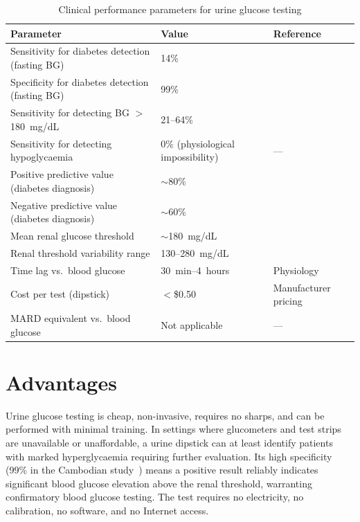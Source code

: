 \begin{table}[H]
\centering
\caption{Clinical performance parameters for urine glucose testing}
\label{tab:urine_stats}
\begin{tabular}{p{7.5cm}p{3.5cm}p{2.5cm}}
\toprule
\textbf{Parameter} & \textbf{Value} & \textbf{Reference} \\
\midrule
Sensitivity for diabetes detection (fasting BG) & 14\% & \cite{cambodia2018} \\
Specificity for diabetes detection (fasting BG) & 99\% & \cite{cambodia2018} \\
Sensitivity for detecting BG $>$180~mg/dL & 21--64\% & \cite{tfrenal} \\
Sensitivity for detecting hypoglycaemia & 0\% (physiological impossibility) & --- \\
Positive predictive value (diabetes diagnosis) & $\sim$80\% & \cite{kingsley2025} \\
Negative predictive value (diabetes diagnosis) & $\sim$60\% & \cite{kingsley2025} \\
Mean renal glucose threshold & $\sim$180~mg/dL & \cite{ncbi_glucosuria} \\
Renal threshold variability range & 130--280~mg/dL & \cite{ncbi_glucosuria} \\
Time lag vs.\ blood glucose & 30~min--4~hours & Physiology \\
Cost per test (dipstick) & $<$\$0.50 & Manufacturer pricing \\
MARD equivalent vs.\ blood glucose & Not applicable & --- \\
\bottomrule
\end{tabular}
\end{table}

\section{Advantages}

Urine glucose testing is cheap, non-invasive, requires no sharps, and can be performed with minimal training. In settings where glucometers and test strips are unavailable or unaffordable, a urine dipstick can at least identify patients with marked hyperglycaemia requiring further evaluation. Its high specificity (99\% in the Cambodian study~\cite{cambodia2018}) means a positive result reliably indicates significant blood glucose elevation above the renal threshold, warranting confirmatory blood glucose testing. The test requires no electricity, no calibration, no software, and no Internet access.

